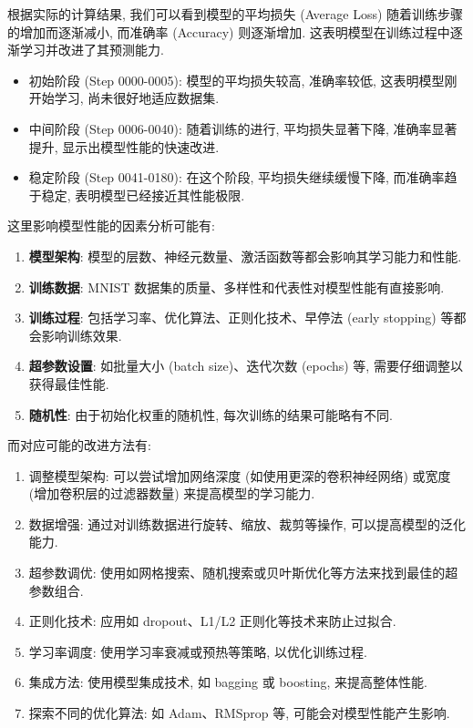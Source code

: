 \documentclass{ctexart}
\begin{document}
根据实际的计算结果, 我们可以看到模型的平均损失 (Average Loss) 随着训练步骤的增加而逐渐减小,
而准确率 (Accuracy) 则逐渐增加. 这表明模型在训练过程中逐渐学习并改进了其预测能力.

\begin{itemize}
    \item 初始阶段 (Step 0000-0005): 模型的平均损失较高, 准确率较低, 这表明模型刚开始学习, 尚未很好地适应数据集.
    \item 中间阶段 (Step 0006-0040): 随着训练的进行, 平均损失显著下降, 准确率显著提升, 显示出模型性能的快速改进.
    \item 稳定阶段 (Step 0041-0180): 在这个阶段, 平均损失继续缓慢下降, 而准确率趋于稳定, 表明模型已经接近其性能极限.
\end{itemize}

这里影响模型性能的因素分析可能有:
\begin{enumerate}
    \item {\bfseries 模型架构}: 模型的层数、神经元数量、激活函数等都会影响其学习能力和性能.
    \item {\bfseries 训练数据}: MNIST 数据集的质量、多样性和代表性对模型性能有直接影响.
    \item {\bfseries 训练过程}: 包括学习率、优化算法、正则化技术、早停法 (early stopping) 等都会影响训练效果.
    \item {\bfseries 超参数设置}: 如批量大小 (batch size)、迭代次数 (epochs) 等, 需要仔细调整以获得最佳性能.
    \item {\bfseries 随机性}: 由于初始化权重的随机性, 每次训练的结果可能略有不同.
\end{enumerate}

而对应可能的改进方法有:
\begin{enumerate}
    \item 调整模型架构: 可以尝试增加网络深度 (如使用更深的卷积神经网络) 或宽度 (增加卷积层的过滤器数量) 来提高模型的学习能力.
    \item 数据增强: 通过对训练数据进行旋转、缩放、裁剪等操作, 可以提高模型的泛化能力.
    \item 超参数调优: 使用如网格搜索、随机搜索或贝叶斯优化等方法来找到最佳的超参数组合.
    \item 正则化技术: 应用如 dropout、L1/L2 正则化等技术来防止过拟合.
    \item 学习率调度: 使用学习率衰减或预热等策略, 以优化训练过程.
    \item 集成方法: 使用模型集成技术, 如 bagging 或 boosting, 来提高整体性能.
    \item 探索不同的优化算法: 如 Adam、RMSprop 等, 可能会对模型性能产生影响.
\end{enumerate}
\end{document}
